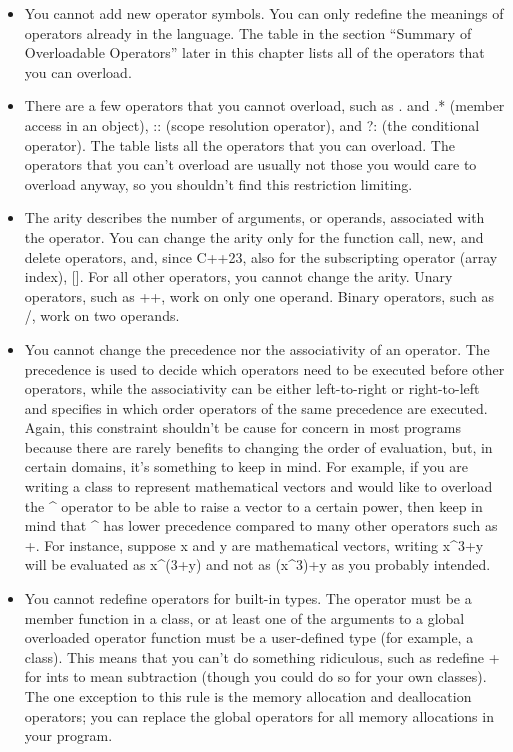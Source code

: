 \begin{itemize}
\item
You cannot add new operator symbols. You can only redefine the meanings of operators already in the language. The table in the section “Summary of Overloadable Operators” later in this chapter lists all of the operators that you can overload.

\item
There are a few operators that you cannot overload, such as . and .* (member access in an object), :: (scope resolution operator), and ?: (the conditional operator). The table lists all the operators that you can overload. The operators that you can’t overload are usually not those you would care to overload anyway, so you shouldn’t find this restriction limiting.

\item
The arity describes the number of arguments, or operands, associated with the operator. You can change the arity only for the function call, new, and delete operators, and, since C++23, also for the subscripting operator (array index), []. For all other operators, you cannot change the arity. Unary operators, such as ++, work on only one operand. Binary operators, such as /, work on two operands.

\item
You cannot change the precedence nor the associativity of an operator. The precedence is used to decide which operators need to be executed before other operators, while the associativity can be either left-to-right or right-to-left and specifies in which order operators of the same precedence are executed. Again, this constraint shouldn’t be cause for concern in most programs because there are rarely benefits to changing the order of evaluation, but, in certain domains, it’s something to keep in mind. For example, if you are writing a class to represent mathematical vectors and would like to overload the \^{} operator to be able to raise a vector to a certain power, then keep in mind that \^{} has lower precedence compared to many other operators such as +. For instance, suppose x and y are mathematical vectors, writing x\^{}3+y will be evaluated as x\^{}(3+y) and not as (x\^{}3)+y as you probably intended.

\item
You cannot redefine operators for built-in types. The operator must be a member function in a class, or at least one of the arguments to a global overloaded operator function must be a user-defined type (for example, a class). This means that you can’t do something ridiculous, such as redefine + for ints to mean subtraction (though you could do so for your own classes). The one exception to this rule is the memory allocation and deallocation operators; you can replace the global operators for all memory allocations in your program.
\end{itemize}

